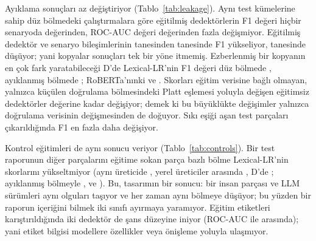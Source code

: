 \documentclass[journal]{IEEEtran}
\begin{document}
Ayıklama sonuçları az değiştiriyor (Tablo~\ref{tab:leakage}). Aynı test kümelerine sahip düz bölmedeki
çalıştırmalara göre eğitilmiş dedektörlerin F1 değeri hiçbir senaryoda \LeakMaxDeltaPurgeFOne{} değerinden,
ROC-AUC değeri \LeakMaxDeltaPurgeAuc{} değerinden fazla değişmiyor. Eğitilmiş dedektör ve senaryo bileşimlerinin
\LeakNCompPurgeFOne{} tanesinden \LeakNUpPurgeFOne{} tanesinde F1 yükseliyor, \LeakNDownPurgeFOne{} tanesinde
düşüyor; yani kopyalar sonuçları tek bir yöne itmemiş. Ezberlenmiş bir kopyanın en çok fark yaratabileceği D'de
Lexical-LR'nin F1 değeri düz bölmede \LeakDLexlrPlain{}, ayıklanmış bölmede \LeakDLexlrPurged{}; RoBERTa'nınki
\LeakDTransPlain{} ve \LeakDTransPurged{}. Skorları eğitim verisine bağlı olmayan, yalnızca küçülen doğrulama
bölmesindeki Platt eşlemesi yoluyla değişen eğitimsiz dedektörler \LeakMaxDeltaZeroPurge{} değerine kadar
değişiyor; demek ki bu büyüklükte değişimler yalnızca doğrulama verisinin değişmesinden de doğuyor. Sıkı eşiği
aşan test parçaları çıkarıldığında F1 en fazla \LeakMaxDeltaStrictFOne{} daha değişiyor.

Kontrol eğitimleri de aynı sonucu veriyor (Tablo~\ref{tab:controls}). Bir test raporunun diğer parçalarını eğitime
sokan parça bazlı bölme Lexical-LR'nin skorlarını yükseltmiyor (aynı üreticide \CtrlChunkInLexlr{}, yerel
üreticiler arasında \CtrlChunkCrossLexlr{}, D'de \CtrlChunkDLexlr{}; ayıklanmış bölmeyle \CtrlSourceInLexlr{},
\CtrlSourceCrossLexlr{} ve \CtrlSourceDLexlr{}). Bu, tasarımın bir sonucu: bir insan parçası ve LLM sürümleri aynı
olguları taşıyor ve her zaman aynı bölmeye düşüyor; bu yüzden bir raporun içeriğini bilmek iki sınıfı ayırmaya
yaramıyor. Eğitim etiketleri karıştırıldığında iki dedektör de şans düzeyine iniyor (ROC-AUC \CtrlShuffledAucMin{}
ile \CtrlShuffledAucMax{} arasında); yani etiket bilgisi modellere özellikler veya önişleme yoluyla ulaşmıyor.
\end{document}
